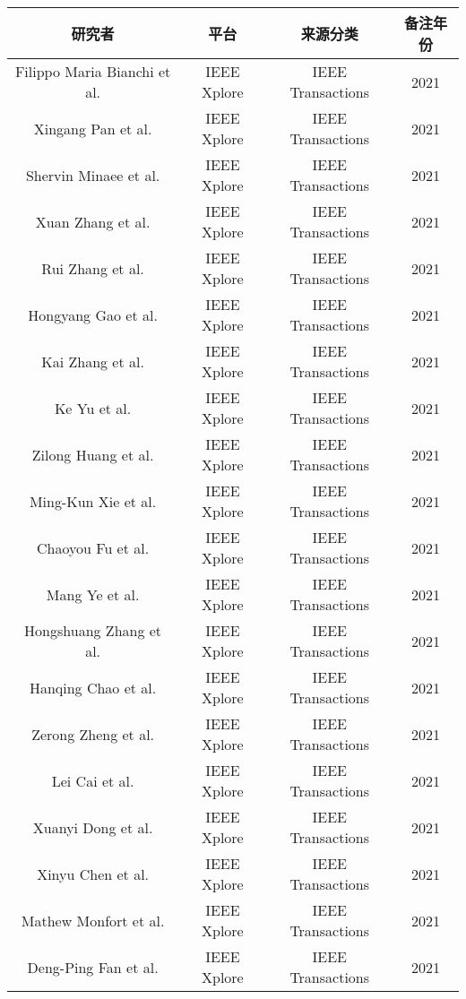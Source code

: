 \begin{center}
\begin{tabular}{cccc}
\hline
研究者 & 平台 & 来源分类 & 备注年份  \\
\hline
Filippo Maria Bianchi et al. \cite{filippo2021} & IEEE Xplore & IEEE Transactions & 2021 \\
Xingang Pan et al. \cite{xingang2021} & IEEE Xplore & IEEE Transactions & 2021 \\
Shervin Minaee et al. \cite{shervin2021} & IEEE Xplore & IEEE Transactions & 2021 \\
Xuan Zhang et al. \cite{xuan2021} & IEEE Xplore & IEEE Transactions & 2021 \\
Rui Zhang et al. \cite{rui2021} & IEEE Xplore & IEEE Transactions & 2021 \\
Hongyang Gao et al. \cite{hongyang2021} & IEEE Xplore & IEEE Transactions & 2021 \\
Kai Zhang et al. \cite{kai2021} & IEEE Xplore & IEEE Transactions & 2021 \\
Ke Yu et al. \cite{ke2021} & IEEE Xplore & IEEE Transactions & 2021 \\
Zilong Huang et al. \cite{zilong2021} & IEEE Xplore & IEEE Transactions & 2021 \\
Ming-Kun Xie et al. \cite{mingkun2021} & IEEE Xplore & IEEE Transactions & 2021 \\
Chaoyou Fu et al. \cite{chaoyou2021} & IEEE Xplore & IEEE Transactions & 2021 \\
Mang Ye et al. \cite{mang2021} & IEEE Xplore & IEEE Transactions & 2021 \\
Hongshuang Zhang et al. \cite{hongshuang2021} & IEEE Xplore & IEEE Transactions & 2021 \\
Hanqing Chao et al. \cite{hanqing2021} & IEEE Xplore & IEEE Transactions & 2021 \\
Zerong Zheng et al. \cite{zerong2021} & IEEE Xplore & IEEE Transactions & 2021 \\
Lei Cai et al. \cite{lei2021} & IEEE Xplore & IEEE Transactions & 2021 \\
Xuanyi Dong et al. \cite{xuanyi2021} & IEEE Xplore & IEEE Transactions & 2021 \\
Xinyu Chen et al. \cite{xinyu2021} & IEEE Xplore & IEEE Transactions & 2021 \\
Mathew Monfort et al. \cite{mathew2021} & IEEE Xplore & IEEE Transactions & 2021 \\
Deng-Ping Fan et al. \cite{dengping2021} & IEEE Xplore & IEEE Transactions & 2021 \\

\end{tabular}
\end{center}
